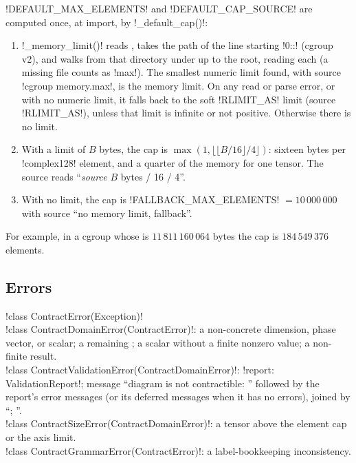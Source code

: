 \begin{definition}\label{def:semantics-default-cap}
\py!DEFAULT_MAX_ELEMENTS! and \py!DEFAULT_CAP_SOURCE! are computed once, at import, by \py!_default_cap()!:
\begin{enumerate}
\item \py!_memory_limit()! reads , takes the path of the line starting \code!0::! (cgroup v2), and walks from that directory under  up to the root, reading each  (a missing file counts as \code!max!). The smallest numeric limit found, with source \code!cgroup memory.max!, is the memory limit. On any read or parse error, or with no numeric limit, it falls back to the soft \code!RLIMIT_AS! limit (source \code!RLIMIT_AS!), unless that limit is infinite or not positive. Otherwise there is no limit.
\item With a limit of $B$ bytes, the cap is $\max(1,\lfloor\lfloor B/16\rfloor/4\rfloor)$: sixteen bytes per \py!complex128! element, and a quarter of the memory for one tensor. The source reads ``\textit{source} $B$ bytes / 16 / 4''.
\item With no limit, the cap is \py!FALLBACK_MAX_ELEMENTS! $=10\,000\,000$ with source ``no memory limit, fallback''.
\end{enumerate}
For example, in a cgroup whose  is $11\,811\,160\,064$ bytes the cap is $184\,549\,376$ elements.
\end{definition}

\subsection{Errors}

\begin{signature}
\py!class ContractError(Exception)!\\
\py!class ContractDomainError(ContractError)!: a non-concrete dimension, phase vector, or scalar; a remaining \bbox{}; a scalar without a finite nonzero value; a non-finite result.\\
\py!class ContractValidationError(ContractDomainError)!: \py!report: ValidationReport!; message ``diagram is not contractible: '' followed by the report's error messages (or its deferred messages when it has no errors), joined by ``; ''.\\
\py!class ContractSizeError(ContractDomainError)!: a tensor above the element cap or the axis limit.\\
\py!class ContractGrammarError(ContractError)!: a label-bookkeeping inconsistency.
\end{signature}

